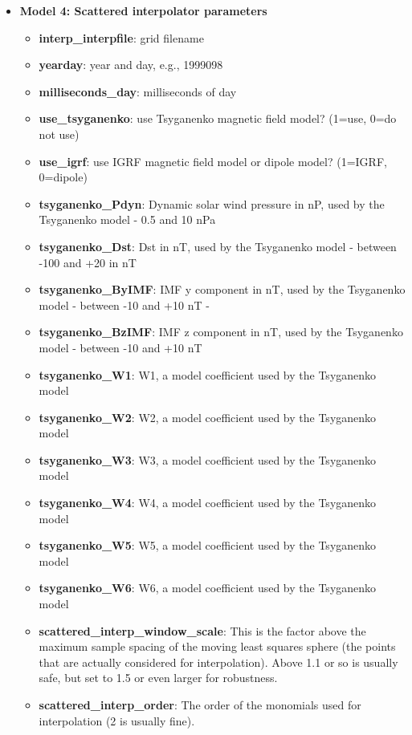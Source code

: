 \documentclass[10pt]{article}
\begin{document}
\begin{itemize}
  \item{\bf Model 4: Scattered interpolator parameters}
    \begin{itemize}
    \item{\bf interp\_interpfile}:
      grid filename
    \item{\bf yearday}:
      year and day, e.g., 1999098
    \item{\bf milliseconds\_day}:
      milliseconds of day
    \item{\bf use\_tsyganenko}:
      use Tsyganenko magnetic field model? (1=use, 0=do not use)
    \item{\bf use\_igrf}:
      use IGRF magnetic field model or dipole model? (1=IGRF, 0=dipole)
    \item{\bf tsyganenko\_Pdyn}:
      Dynamic solar wind pressure in nP, used by the Tsyganenko model
      - 0.5 and 10 nPa
    \item{\bf tsyganenko\_Dst}:
      Dst in nT, used by the Tsyganenko model - between -100 and +20 in nT
    \item{\bf tsyganenko\_ByIMF}:
      IMF y component in nT, used by the Tsyganenko model - between
      -10 and +10 nT -
    \item{\bf tsyganenko\_BzIMF}:
      IMF z component in nT, used by the Tsyganenko model - between
      -10 and +10 nT
    \item{\bf tsyganenko\_W1}:
      W1, a model coefficient used by the Tsyganenko model
    \item{\bf tsyganenko\_W2}:
      W2, a model coefficient used by the Tsyganenko model
    \item{\bf tsyganenko\_W3}:
      W3, a model coefficient used by the Tsyganenko model
    \item{\bf tsyganenko\_W4}:
      W4, a model coefficient used by the Tsyganenko model
    \item{\bf tsyganenko\_W5}:
      W5, a model coefficient used by the Tsyganenko model
    \item{\bf tsyganenko\_W6}:
      W6, a model coefficient used by the Tsyganenko model
    \item{\bf scattered\_interp\_window\_scale}: This is the factor
      above the maximum sample spacing of the moving least squares
      sphere (the points that are actually considered for
      interpolation).  Above 1.1 or so is usually safe, but set to 1.5
      or even larger for robustness.
    \item{\bf scattered\_interp\_order}:
      The order of the monomials used for interpolation (2 is usually fine).

\end{itemize}
\end{itemize}
\end{document}
